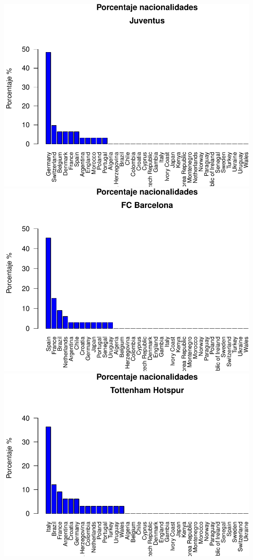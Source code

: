 \documentclass[]{article}
\begin{document}
\includegraphics{taller_FIFA_SOLUCION_files/figure-latex/unnamed-chunk-9-1.pdf}
\includegraphics{taller_FIFA_SOLUCION_files/figure-latex/unnamed-chunk-9-2.pdf}
\includegraphics{taller_FIFA_SOLUCION_files/figure-latex/unnamed-chunk-9-3.pdf}
\end{document}
